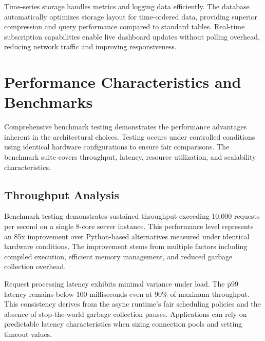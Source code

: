 \documentclass[12pt,a4paper,twoside]{report}
\begin{document}
Time-series storage handles metrics and logging data efficiently. The database automatically optimizes storage layout for time-ordered data, providing superior compression and query performance compared to standard tables. Real-time subscription capabilities enable live dashboard updates without polling overhead, reducing network traffic and improving responsiveness.

\section{Performance Characteristics and Benchmarks}

Comprehensive benchmark testing demonstrates the performance advantages inherent in the architectural choices. Testing occurs under controlled conditions using identical hardware configurations to ensure fair comparisons. The benchmark suite covers throughput, latency, resource utilization, and scalability characteristics.

\subsection{Throughput Analysis}

Benchmark testing demonstrates sustained throughput exceeding 10,000 requests per second on a single 8-core server instance. This performance level represents an 85x improvement over Python-based alternatives measured under identical hardware conditions. The improvement stems from multiple factors including compiled execution, efficient memory management, and reduced garbage collection overhead.

Request processing latency exhibits minimal variance under load. The p99 latency remains below 100 milliseconds even at 90\% of maximum throughput. This consistency derives from the async runtime's fair scheduling policies and the absence of stop-the-world garbage collection pauses. Applications can rely on predictable latency characteristics when sizing connection pools and setting timeout values.
\end{document}
